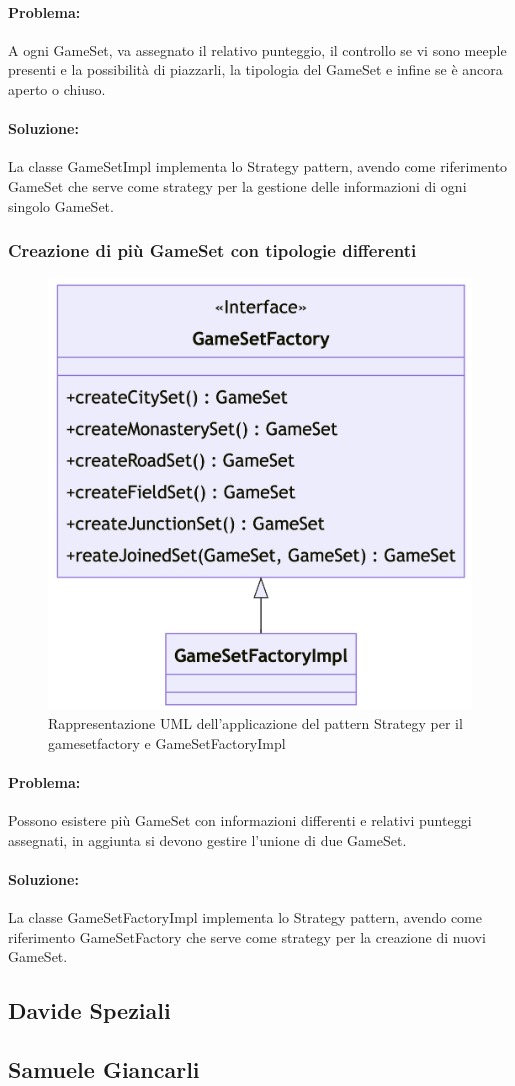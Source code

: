 \paragraph{Problema:}
A ogni GameSet, va assegnato il relativo punteggio, il controllo se vi sono meeple presenti e la possibilità di piazzarli, la tipologia del GameSet e infine se è ancora aperto o chiuso.
\paragraph{Soluzione:}
La classe GameSetImpl implementa lo Strategy pattern, avendo come riferimento GameSet che serve come strategy per la gestione delle informazioni di ogni singolo GameSet.

\subsubsection*{Creazione di più GameSet con tipologie differenti}
\begin{figure}[ht]
    \centering\includegraphics[scale=.3]{images/gamesetfactory.png}
    \caption{Rappresentazione UML dell'applicazione del pattern Strategy per il gamesetfactory e GameSetFactoryImpl}
\end{figure}

\paragraph{Problema:}
Possono esistere più GameSet con informazioni differenti e relativi punteggi assegnati, in aggiunta si devono gestire l'unione di due GameSet.
\paragraph{Soluzione:}
La classe GameSetFactoryImpl implementa lo Strategy pattern, avendo come riferimento GameSetFactory che serve come strategy per la creazione di nuovi GameSet.

\subsection*{Davide Speziali}

\subsection*{Samuele Giancarli}
